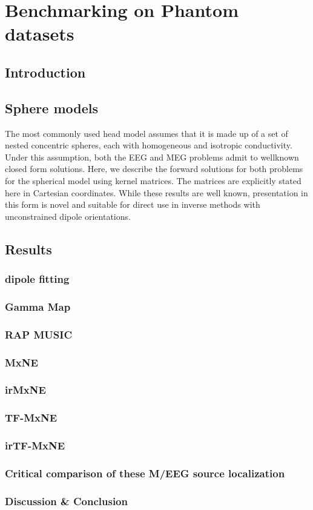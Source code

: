 
\chapter{Benchmarking on Phantom datasets}
\label{chapter:benchmark}
\noindent\makebox[\linewidth]{\rule{0.75\paperwidth}{0.4pt}}
\noindent\makebox[\linewidth]{\rule{0.75\paperwidth}{0.4pt}}

\localtableofcontents %

\noindent\makebox[\linewidth]{\rule{0.75\paperwidth}{0.4pt}}
\noindent\makebox[\linewidth]{\rule{0.75\paperwidth}{0.4pt}}
\newpage

\section{Introduction}
\section{Sphere models}
The most commonly used head model assumes that it is made up of a set of nested concentric spheres, each with homogeneous and isotropic conductivity. Under this assumption, both the EEG and MEG problems admit to wellknown closed form solutions. Here, we describe the forward solutions for both problems for the spherical model using kernel matrices. The matrices are explicitly stated here in Cartesian coordinates. While these results are well known, presentation in this form is novel and suitable for direct use in inverse methods with unconstrained dipole orientations.
~\cite{mosher1999eeg}
\section{Results}
\subsection{dipole fitting}
\subsection{Gamma Map}
\subsection{RAP MUSIC}
\subsection{MxNE}
\subsection{irMxNE}
\subsection{TF-MxNE}
\subsection{irTF-MxNE}
\subsection{Critical comparison of these M/EEG source localization}
\subsection{Discussion \& Conclusion}